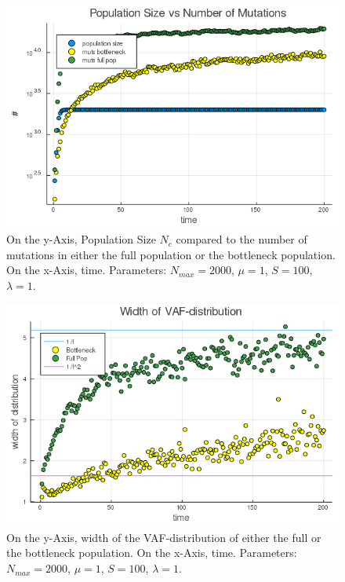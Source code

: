 \documentclass{article}
\numberwithin{equation}{subsection}
\begin{document}
		\begin{figure}[h!]
	\centering
	\includegraphics[width=\linewidth]{Figures/LogGrowth/document/LogGrowthBasic/LogVarTimesMutLive_N2000_mu1_t200_d1_C0}
	
	\caption{On the y-Axis, Population Size $N_c$ compared to the number of mutations in either the full population or the bottleneck population. On the x-Axis, time. Parameters: $ N_{max} = 2000$, $\mu = 1 $, $ S = 100 $, $ \lambda = 1$.}
	\label{fig::NMutstime2}
	\end{figure}
	

\begin{figure}[h!]
	\centering
	\includegraphics[width=\linewidth]{Figures/LogGrowth/document/LogGrowthBasic/LogVarTimesAlt_N2000_mu1_t200_d1_C0}
	
	\caption{On the y-Axis, width of the VAF-distribution of either the full or the bottleneck population. On the x-Axis, time. Parameters: $ N_{max} = 2000$, $\mu = 1 $, $ S = 100 $, $ \lambda = 1$.}
	\label{fig::Width2}
\end{figure}
\end{document}
